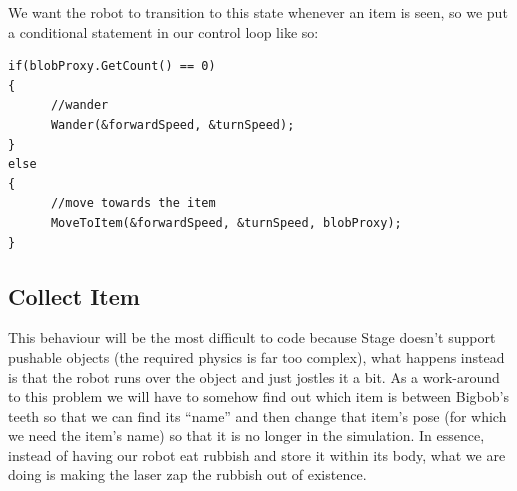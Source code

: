 \documentclass[a4paper]{report}
\begin{document}
We want the robot to transition to this state whenever an item is seen, so we put a conditional statement in our control loop like so:
\begin{verbatim}
if(blobProxy.GetCount() == 0)
{
      //wander
      Wander(&forwardSpeed, &turnSpeed);
}
else
{
      //move towards the item
      MoveToItem(&forwardSpeed, &turnSpeed, blobProxy);
}
\end{verbatim}

\subsection{Collect Item}\label{sec:Coding:UsingProxiesExample:CollectItem}
This behaviour will be the most difficult to code because Stage doesn't support pushable objects (the required physics is far too complex), what happens instead is that the robot runs over the object and just jostles it a bit. 
As a work-around to this problem we will have to somehow find out which item is between Bigbob's teeth so that we can find its ``name'' and then change that item's pose (for which we need the item's name) so that it is no longer in the simulation. In essence, instead of having our robot eat rubbish and store it within its body, what we are doing is making the laser zap the rubbish out of existence.
\end{document}
